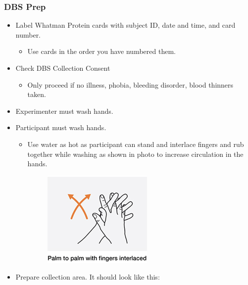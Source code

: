\documentclass[]{book}
\providecommand{\tightlist}{%
  \setlength{\itemsep}{0pt}\setlength{\parskip}{0pt}}
\begin{document}
\hypertarget{dbs-prep}{%
\subsubsection{DBS Prep}\label{dbs-prep}}

\begin{itemize}
\tightlist
\item
  Label Whatman Protein cards with subject ID, date and time, and card number.

  \begin{itemize}
  \tightlist
  \item
    Use cards in the order you have numbered them.
  \end{itemize}
\item
  Check DBS Collection Consent

  \begin{itemize}
  \tightlist
  \item
    Only proceed if no illness, phobia, bleeding disorder, blood thinners taken.
  \end{itemize}
\item
  Experimenter must wash hands.
\item
  Participant must wash hands.

  \begin{itemize}
  \item
    Use water as hot as participant can stand and interlace fingers and rub together while washing as shown in photo to increase circulation in the hands.

    \begin{figure}
    \centering
    \includegraphics{images/dbs/1.png}
    \caption{}
    \end{figure}
  \end{itemize}
\item
  Prepare collection area. It should look like this:
\end{itemize}
\end{document}
